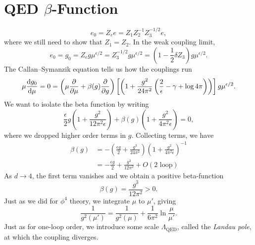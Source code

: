 
\section{QED \texorpdfstring{$\beta$-}{Beta }Function}%
\label{sec:qed_beta_function}

\begin{equation}
  e_0 = Z_e e = Z_1 Z_2^{-1} Z_3^{-1 / 2} e,
\end{equation}
where we still need to show that $Z_1 = Z_2$.
In the weak coupling limit,
\begin{equation}
  e_0 = g_0 = Z_e g \mu^{\epsilon / 2} = Z_3^{-1 / 2} g \mu^{\epsilon / 2} = \left( 1 - \frac{1}{2} \delta Z_3 \right) g \mu^{\epsilon / 2}.
\end{equation}
The Callan--Symanzik equation tells us how the couplings run
\begin{equation}
  \mu \dv{g_0}{\mu} = 0 = \left( \mu \frac{\partial }{\partial \mu} + \beta(g) \frac{\partial }{\partial g} \right) \left[ \left( 1 + \frac{g^2}{24 \pi^2} \left( \frac{2}{\epsilon} - \gamma + \log 4\pi \right) \right) \right] g \mu^{\epsilon / 2}.
\end{equation}
We want to isolate the beta function by writing
\begin{equation}
  \frac{\epsilon}{2} g \left( 1 + \frac{g^2}{12 \pi^2 \epsilon} \right) + \beta(g) \left(  1+ \frac{g^2}{4 \pi^2 \epsilon} \right) = 0,
\end{equation}
where we dropped higher order terms in $g$.
Collecting terms, we have
\begin{align}
  \beta(g) &= - \left( \frac{\epsilon g}{2} + \frac{g^3}{24 \pi^2} \right) \left( 1 + \frac{g^2}{4 \pi^2 \epsilon} \right)^{-1} \\
	   &= - \frac{\epsilon g}{2} + \frac{g^3}{12 \pi^2} + O(\text{2 loop})
\end{align}
As $d \to 4$, the first term vanishes and we obtain a positive beta-function
\begin{equation}
  \beta(g) = \frac{g^3}{12 \pi^2} > 0.
\end{equation}
Just as we did for $\phi^4$ theory, we integrate $\mu$ to $\mu'$, giving
\begin{equation}
  \frac{1}{g^2(\mu')} = \frac{1}{g^2 (\mu)} + \frac{1}{6 \pi^2} \ln \frac{\mu}{\mu'}.
\end{equation}
Just as for one-loop order, we introduce some scale $\Lambda_{\text{QED}}$, called the \emph{Landau pole}, at which the coupling diverges.
